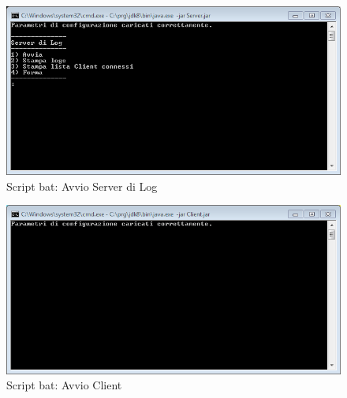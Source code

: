 \documentclass[a4paper, 11pt]{article} %
\begin{document}
\begin{center}
\begin{figure}[H]
\includegraphics[width=1.0\textwidth]{images/script_bat-2.PNG}
\vspace{-0.7cm}
\caption{Script bat: Avvio Server di Log}
\end{figure}
\end{center}
\vspace{-1.4cm}
\begin{center}
\begin{figure}[H]
\includegraphics[width=1.0\textwidth]{images/script_bat-3.PNG}
\vspace{-0.7cm}
\caption{Script bat: Avvio Client}
\end{figure}
\end{center}
\end{document}
